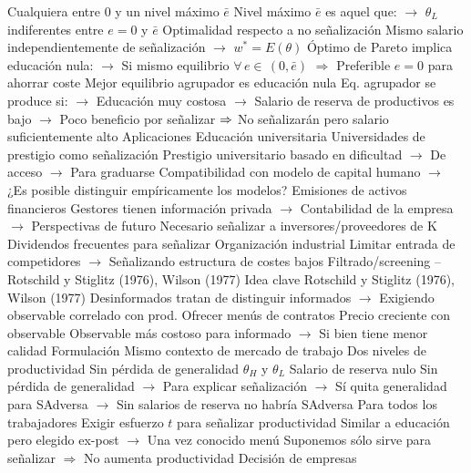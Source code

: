 \documentclass{nuevotema}
\begin{document}
\begin{esquemal}
				\4[] Cualquiera entre 0 y un nivel máximo $\bar{e}$
				\4[] Nivel máximo $\bar{e}$ es aquel que:
				\4[] $\to$ $\theta_L$ indiferentes entre $e=0$ y $\bar{e}$
				\4 Optimalidad respecto a no señalización
				\4[] Mismo salario independientemente de señalización
				\4[] $\to$ $w^* = E(\theta)$
				\4[] Óptimo de Pareto implica educación nula:
				\4[] $\to$ Si mismo equilibrio $\forall \, e \in \, (0, \bar{e})$
				\4[] $\Rightarrow$ Preferible $e=0$ para ahorrar coste
				\4[$\Rightarrow$] Mejor equilibrio agrupador es educación nula
				\4[$\then$] Eq. agrupador se produce si:
				\4[] $\to$ Educación muy costosa
				\4[] $\to$ Salario de reserva de productivos es bajo
				\4[] $\to$ Poco beneficio por señalizar
				\4[] $\then$ No señalizarán pero salario suficientemente alto
			\3 Aplicaciones
				\4 Educación universitaria
				\4[] Universidades de prestigio como señalización
				\4[] Prestigio universitario basado en dificultad
				\4[] $\to$ De acceso
				\4[] $\to$ Para graduarse
				\4[] Compatibilidad con modelo de capital humano
				\4[] $\to$ ¿Es posible distinguir empíricamente los modelos?
				\4 Emisiones de activos financieros
				\4[] Gestores tienen información privada
				\4[] $\to$ Contabilidad de la empresa
				\4[] $\to$ Perspectivas de futuro
				\4[] Necesario señalizar a inversores/proveedores de K
				\4[] Dividendos frecuentes para señalizar
				\4 Organización industrial
				\4[] Limitar entrada de competidores
				\4[] $\to$ Señalizando estructura de costes bajos
		\2 Filtrado/screening -- Rotschild y Stiglitz (1976), Wilson (1977)
			\3 Idea clave
				\4 Rotschild y Stiglitz (1976), Wilson (1977)
				\4 Desinformados tratan de distinguir informados
				\4[] $\to$ Exigiendo observable correlado con prod.
				\4 Ofrecer menús de contratos
				\4[] Precio creciente con observable
				\4[] Observable más costoso para informado
				\4[] $\to$ Si bien tiene menor calidad
			\3 Formulación
				\4 Mismo contexto de mercado de trabajo
				\4 Dos niveles de productividad
				\4[] Sin pérdida de generalidad
				\4[] $\theta_H$ y $\theta_L$
				\4 Salario de reserva nulo
				\4[] Sin pérdida de generalidad
				\4[] $\to$ Para explicar señalización
				\4[] $\to$ Sí quita generalidad para SAdversa
				\4[] $\to$ Sin salarios de reserva no habría SAdversa
				\4[] Para todos los trabajadores
				\4 Exigir esfuerzo $t$ para señalizar productividad
				\4[] Similar a educación pero elegido ex-post
				\4[] $\to$ Una vez conocido menú
				\4[] Suponemos sólo sirve para señalizar
				\4[] $\Rightarrow$ No aumenta productividad
				\4 Decisión de empresas

\end{esquemal}
\end{document}
